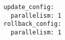 \begin{lstlisting}
update_config:
  parallelism: 1
rollback_config:
  parallelism: 1
\end{lstlisting}








